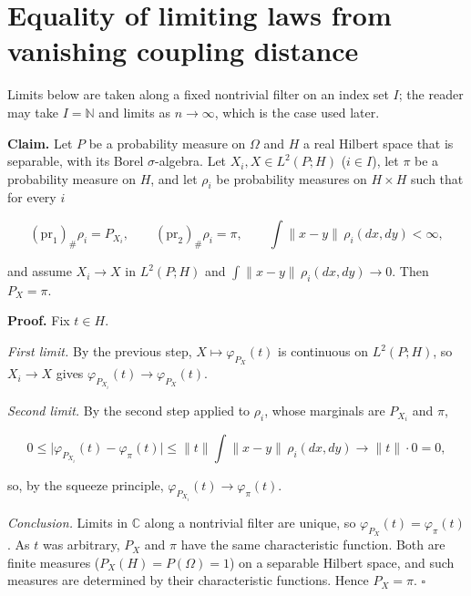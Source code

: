 \documentclass[11pt,a4paper]{article}
\begin{document}
\section{\texorpdfstring{Equality of limiting laws from vanishing coupling distance}{Equality of limiting laws from vanishing coupling distance}}


Limits below are taken along a fixed nontrivial filter on an index set \(I\); the reader may take \(I=\mathbb N\) and limits as \(n\to\infty\), which is the case used later.




\textbf{Claim.} Let \(P\) be a probability measure on \(\Omega\) and \(H\) a real Hilbert space that is separable, with its Borel \(\sigma\)-algebra. Let \(X_i,X\in L^2(P;H)\) (\(i\in I\)), let \(\pi\) be a probability measure on \(H\), and let \(\rho_i\) be probability measures on \(H\times H\) such that for every \(i\)


\[(\mathrm{pr}_1)_\#\rho_i=P_{X_i},\qquad(\mathrm{pr}_2)_\#\rho_i=\pi,\qquad\int\|x-y\|\,\rho_i(dx,dy)<\infty,\]


and assume \(X_i\to X\) in \(L^2(P;H)\) and \(\int\|x-y\|\,\rho_i(dx,dy)\to0\). Then \(P_X=\pi\).




\textbf{Proof.} Fix \(t\in H\).




\emph{First limit.} By the previous step, \(X\mapsto\varphi_{P_X}(t)\) is continuous on \(L^2(P;H)\), so \(X_i\to X\) gives \(\varphi_{P_{X_i}}(t)\to\varphi_{P_X}(t)\).




\emph{Second limit.} By the second step applied to \(\rho_i\), whose marginals are \(P_{X_i}\) and \(\pi\),


\[0\le\bigl|\varphi_{P_{X_i}}(t)-\varphi_\pi(t)\bigr|\le\|t\|\int\|x-y\|\,\rho_i(dx,dy)\longrightarrow\|t\|\cdot0=0,\]


so, by the squeeze principle, \(\varphi_{P_{X_i}}(t)\to\varphi_\pi(t)\).




\emph{Conclusion.} Limits in \(\mathbb C\) along a nontrivial filter are unique, so \(\varphi_{P_X}(t)=\varphi_\pi(t)\). As \(t\) was arbitrary, \(P_X\) and \(\pi\) have the same characteristic function. Both are finite measures (\(P_X(H)=P(\Omega)=1\)) on a separable Hilbert space, and such measures are determined by their characteristic functions. Hence \(P_X=\pi\). \(\square\)
\end{document}
